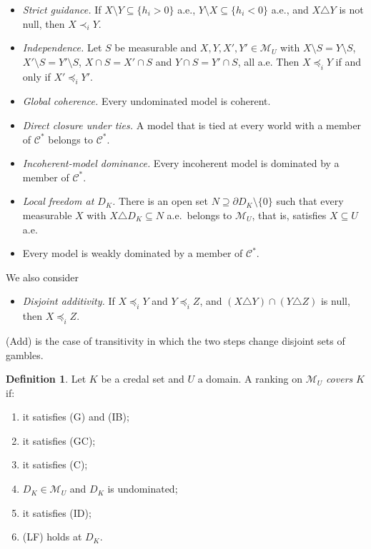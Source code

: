 \documentclass[11pt]{article}
\newcommand{\M}{\mathcal{M}}
\newcommand{\CC}{\mathcal{C}}
\theoremstyle{plain}
\theoremstyle{definition}
\newtheorem{definition}[theorem]{Definition}
\theoremstyle{remark}
\begin{document}
\begin{itemize}
  \item[(G)] \emph{Strict guidance.} If $X\setminus Y\subseteq\{h_i>0\}$ a.e.,
  $Y\setminus X\subseteq\{h_i<0\}$ a.e., and $X\triangle Y$ is not null, then
  $X\prec_iY$.
  \item[(IB)] \emph{Independence.} Let $S$ be measurable and $X,Y,X',Y'\in\M_U$ with
  $X\setminus S=Y\setminus S$, $X'\setminus S=Y'\setminus S$, $X\cap S=X'\cap S$ and
  $Y\cap S=Y'\cap S$, all a.e. Then $X\preceq_iY$ if and only if $X'\preceq_iY'$.
  \item[(GC)] \emph{Global coherence.} Every undominated model is coherent.
  \item[(C)] \emph{Direct closure under ties.} A model that is tied at every world with a
  member of $\CC^\ast$ belongs to $\CC^\ast$.
  \item[(ID)] \emph{Incoherent-model dominance.} Every incoherent model is dominated by a
  member of $\CC^\ast$.
  \item[(LF)] \emph{Local freedom at $D_K$.} There is an open set $N\supseteq\partial
  D_K\setminus\{0\}$ such that every measurable $X$ with $X\triangle D_K\subseteq N$ a.e.\
  belongs to $\M_U$, that is, satisfies $X\subseteq U$ a.e.
  \item[(W)] Every model is weakly dominated by a member of $\CC^\ast$.
\end{itemize}
We also consider
\begin{itemize}
  \item[(Add)] \emph{Disjoint additivity.} If $X\preceq_iY$ and $Y\preceq_iZ$, and
  $(X\triangle Y)\cap(Y\triangle Z)$ is null, then $X\preceq_iZ$.
\end{itemize}
(Add) is the case of transitivity in which the two steps change disjoint sets of gambles.

\begin{definition}\label{def:cover}
Let $K$ be a credal set and $U$ a domain. A ranking on $\M_U$ \emph{covers} $K$ if:
\begin{enumerate}[label=(\roman*)]
  \item it satisfies (G) and (IB);
  \item it satisfies (GC);
  \item it satisfies (C);
  \item $D_K\in\M_U$ and $D_K$ is undominated;
  \item it satisfies (ID);
  \item (LF) holds at $D_K$.
\end{enumerate}
\end{definition}
\end{document}
